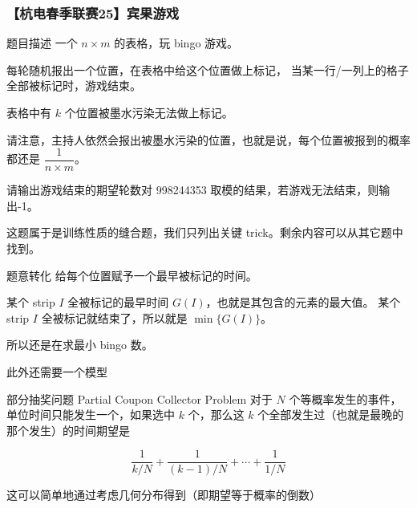 \begin{frame}
  \frametitle{【杭电春季联赛25】宾果游戏}
  
  \begin{block}{题目描述}  
    一个 $n \times m$ 的表格，玩 bingo 游戏。

    每轮随机报出一个位置，在表格中给这个位置做上标记，
    当某一行/一列上的格子全部被标记时，游戏结束。

    表格中有 $k$ 个位置被墨水污染无法做上标记。

    请注意，主持人依然会报出被墨水污染的位置，也就是说，每个位置被报到的概率都还是 $\dfrac{1}{n \times m}$。

    请输出游戏结束的期望轮数对 998244353 取模的结果，若游戏无法结束，则输出-1。

  \end{block}

  这题属于是训练性质的缝合题，我们只列出关键 trick。剩余内容可以从其它题中找到。

\end{frame}

\begin{frame}

  \begin{exampleblock}{题意转化}
    给每个位置赋予一个最早被标记的时间。
    
    某个 strip $I$ 全被标记的最早时间 $G(I)$，也就是其包含的元素的最大值。
    某个 strip $I$ 全被标记就结束了，所以就是 $\min\{G(I)\}$。
    
    所以还是在求最小 bingo 数。

  \end{exampleblock}  

  此外还需要一个模型

  \begin{exampleblock}{部分抽奖问题 Partial Coupon Collector Problem}
    对于 $N$ 个等概率发生的事件，单位时间只能发生一个，如果选中 $k$ 个，那么这 $k$ 个全部发生过（也就是最晚的那个发生）的时间期望是 
    
    $$
    \frac{1}{k/N} + \frac{1}{(k-1)/N} + \cdots+\frac{1}{1/N}
    $$

    这可以简单地通过考虑几何分布得到（即期望等于概率的倒数）

  \end{exampleblock}

\end{frame}
